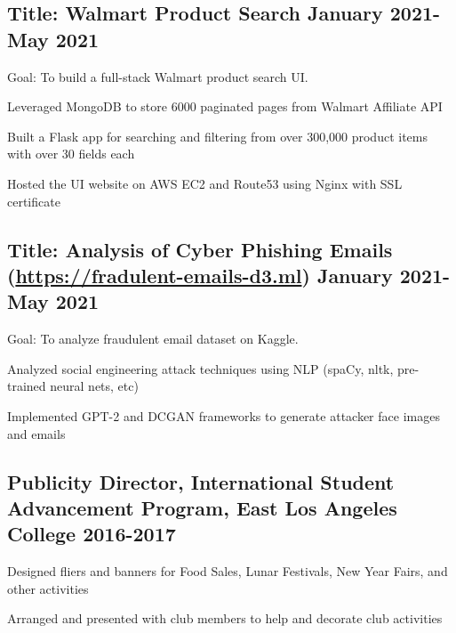 \documentclass[11pt]{article}
\begin{document}
\subsection*{Title: Walmart Product Search \hfill {\normalfont January 2021-May 2021}}
\noindent
\href{https://github.com/Anthonyive/DSCI-551-Project.git}{} Goal: To build a full-stack Walmart product search UI.
\begin{compactitem}
    \item Leveraged MongoDB to store 6000 paginated pages from Walmart 
        Affiliate API
    \item Built a Flask app for searching and filtering from over 300,000 
        product items with over 30 fields each
    \item Hosted the UI website on AWS EC2 and Route53 using Nginx with SSL 
        certificate
\end{compactitem}
\vspace{0.1in}

\subsection*{Title: Analysis of Cyber Phishing Emails 
(\href{https://fradulent-emails-d3.ml}{https://fradulent-emails-d3.ml}) \hfill 
{\normalfont January 2021-May 2021}}
\noindent
\href{https://github.com/Anthonyive/DSCI-550-Assignments.git}{} 
Goal: To analyze fraudulent email dataset on Kaggle.
\begin{compactitem}
 \item Analyzed social engineering attack techniques using NLP (spaCy, 
     nltk, pre-trained neural nets, etc)
 \item Implemented GPT-2 and DCGAN frameworks to generate attacker 
     face images and emails
\end{compactitem}
\vspace{0.1in}

\subsection*{Publicity Director{\normalfont, International Student Advancement Program, East Los Angeles College \hfill	2016-2017}}
\begin{compactitem}
    \item Designed fliers and banners for Food Sales, Lunar Festivals, 
        New Year Fairs, and other activities
    \item Arranged and presented with club members to help and decorate 
        club activities
\end{compactitem}
\end{document}
